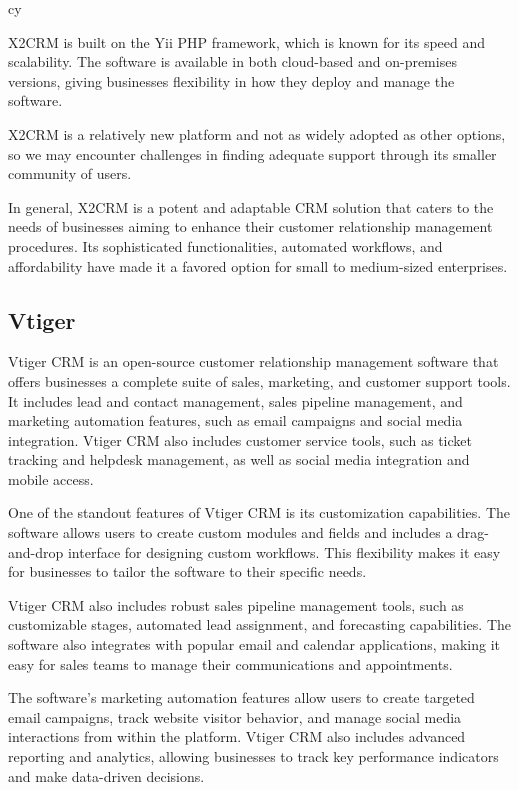 cy\documentclass{article}
\begin{document}
X2CRM is built on the Yii PHP framework, which is known for its speed and scalability. The software is available in both cloud-based and on-premises versions, giving businesses flexibility in how they deploy and manage the software.

X2CRM is a relatively new platform and not as widely adopted as other options, so we may encounter challenges in finding adequate support through its smaller community of users.

In general, X2CRM is a potent and adaptable CRM solution that caters to the needs of businesses aiming to enhance their customer relationship management procedures. Its sophisticated functionalities, automated workflows, and affordability have made it a favored option for small to medium-sized enterprises.

\subsection{Vtiger}

Vtiger CRM is an open-source customer relationship management software that offers businesses a complete suite of sales, marketing, and customer support tools. It includes lead and contact management, sales pipeline management, and marketing automation features, such as email campaigns and social media integration. Vtiger CRM also includes customer service tools, such as ticket tracking and helpdesk management, as well as social media integration and mobile access.

One of the standout features of Vtiger CRM is its customization capabilities. The software allows users to create custom modules and fields and includes a drag-and-drop interface for designing custom workflows. This flexibility makes it easy for businesses to tailor the software to their specific needs.

Vtiger CRM also includes robust sales pipeline management tools, such as customizable stages, automated lead assignment, and forecasting capabilities. The software also integrates with popular email and calendar applications, making it easy for sales teams to manage their communications and appointments.

The software's marketing automation features allow users to create targeted email campaigns, track website visitor behavior, and manage social media interactions from within the platform. Vtiger CRM also includes advanced reporting and analytics, allowing businesses to track key performance indicators and make data-driven decisions.
\end{document}
